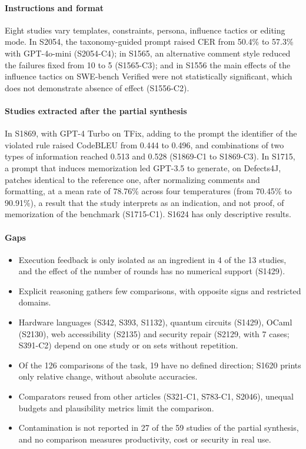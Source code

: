 \paragraph{Instructions and format}
Eight studies vary templates, constraints, persona, influence tactics or editing mode.
In S2054, the taxonomy-guided prompt raised CER from 50.4\% to 57.3\% with GPT-4o-mini (S2054-C4); in S1565, an alternative comment style reduced the failures fixed from 10 to 5 (S1565-C3); and in S1556 the main effects of the influence tactics on SWE-bench Verified were not statistically significant, which does not demonstrate absence of effect (S1556-C2).

\paragraph{Studies extracted after the partial synthesis}
In S1869, with GPT-4 Turbo on TFix, adding to the prompt the identifier of the violated rule raised CodeBLEU from
0.444 to 0.496, and combinations of two types of information reached 0.513 and 0.528 (S1869-C1 to S1869-C3).
In S1715, a prompt that induces memorization led GPT-3.5 to generate, on Defects4J, patches identical to the reference one,
after normalizing comments and formatting, at a mean rate of 78.76\% across four temperatures (from 70.45\% to
90.91\%), a result that the study interprets as an indication, and not proof, of memorization of the benchmark (S1715-C1). S1624 has only descriptive results.

\paragraph{Gaps}
\begin{itemize}
  \item Execution feedback is only isolated as an ingredient in 4 of the 13 studies, and the effect of the number of rounds has no numerical support (S1429).
  \item Explicit reasoning gathers few comparisons, with opposite signs and restricted domains.
  \item Hardware languages (S342, S393, S1132), quantum circuits (S1429), OCaml (S2130), web accessibility (S2135) and security repair (S2129, with 7 cases; S391-C2) depend on one study or on sets without repetition.
  \item Of the 126 comparisons of the task, 19 have no defined direction; S1620 prints only relative change, without absolute accuracies.
  \item Comparators reused from other articles (S321-C1, S783-C1, S2046), unequal budgets and plausibility metrics limit the comparison.
  \item Contamination is not reported in 27 of the 59 studies of the partial synthesis, and no comparison measures productivity, cost or security in real use.
\end{itemize}
